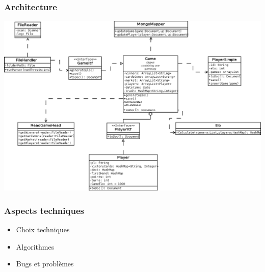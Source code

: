 \documentclass{beamer}
\begin{document}
\begin{frame}
  \frametitle{Architecture}
  \begin{center}
    \includegraphics[scale=0.27,keepaspectratio]{parserArch}
    \end{center}
\end{frame}

\begin{frame}
  \frametitle{Aspects techniques}

  \begin{itemize}
  \item Choix techniques
  \item Algorithmes
  \item Bugs et problèmes
  \end{itemize}
\end{frame}

\end{document}

